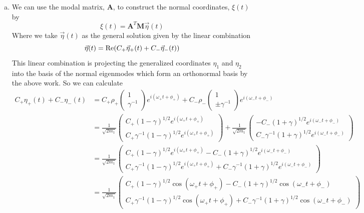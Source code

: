 \documentclass[11pt]{article}
\numberwithin{equation}{section}
\begin{document}
\begin{enumerate}[(a)]
\item We can use the modal matrix, $\mathbf{A}$, to construct the normal coordinates, 
$\xi(t)$ by
$$\xi(t) = \mathbf{A}^T\mathbf{M}\vec{\eta}(t)$$
Where we take $\vec{\eta}(t)$ as the general solution given by the linear combination 
$$\vec{\eta}(t) = \textnormal{Re}(C_+\vec{\eta}_{+}(t)+C_-\vec{\eta}_{-}(t))$$
This linear combination is projecting the generalized coordinates $\eta_1$ and $\eta_2$ into
the basis of the normal eigenmodes which form an orthonormal basis by the above work. So we 
can calculate
\begin{align*}
C_+\eta_{+}(t)+C_-\eta_{-}(t) &= C_+\rho_+\left(\begin{array}{c} 1\\ \gamma^{-1}\end{array}\right)e^{i(\omega_{+}t+\phi_{+})}
+C_-\rho_{-}\left(\begin{array}{c} 1\\ \pm\gamma^{-1}\end{array}\right)e^{i(\omega_{-}t+\phi_{-})}\\
&= \frac{1}{\sqrt{2m_1}}\left(\begin{array}{c} 
                C_+(1-\gamma)^{1/2}e^{i(\omega_{+}t+\phi_{+})}\\ 
                C_+\gamma^{-1}(1-\gamma)^{1/2}e^{i(\omega_{+}t+\phi_{+})}
                       \end{array}\right)
+ \frac{1}{\sqrt{2m_1}}\left(\begin{array}{c} 
                -C_-(1+\gamma)^{1/2}e^{i(\omega_{-}t+\phi_{-})}\\ 
                C_-\gamma^{-1}(1+\gamma)^{1/2}e^{i(\omega_{-}t+\phi_{-})}
                       \end{array}\right)\\
&= \frac{1}{\sqrt{2m_1}}\left(\begin{array}{c} 
                C_+(1-\gamma)^{1/2}e^{i(\omega_{+}t+\phi_{+})}-C_-(1+\gamma)^{1/2}e^{i(\omega_{-}t+\phi_{-})}\\ 
                C_+\gamma^{-1}(1-\gamma)^{1/2}e^{i(\omega_{+}t+\phi_{+})}+C_-\gamma^{-1}(1+\gamma)^{1/2}e^{i(\omega_{-}t+\phi_{-})}
                       \end{array}\right)\\
&= \frac{1}{\sqrt{2m_1}}\left(\begin{array}{c} 
                C_+(1-\gamma)^{1/2}\cos(\omega_{+}t+\phi_{+})-C_-(1+\gamma)^{1/2}\cos(\omega_{-}t+\phi_{-})\\ 
                C_+\gamma^{-1}(1-\gamma)^{1/2}\cos(\omega_{+}t+\phi_{+})+C_-\gamma^{-1}(1+\gamma)^{1/2}\cos(\omega_{-}t+\phi_{-})
                       \end{array}\right)
\end{align*}


\end{enumerate}
\end{document}
